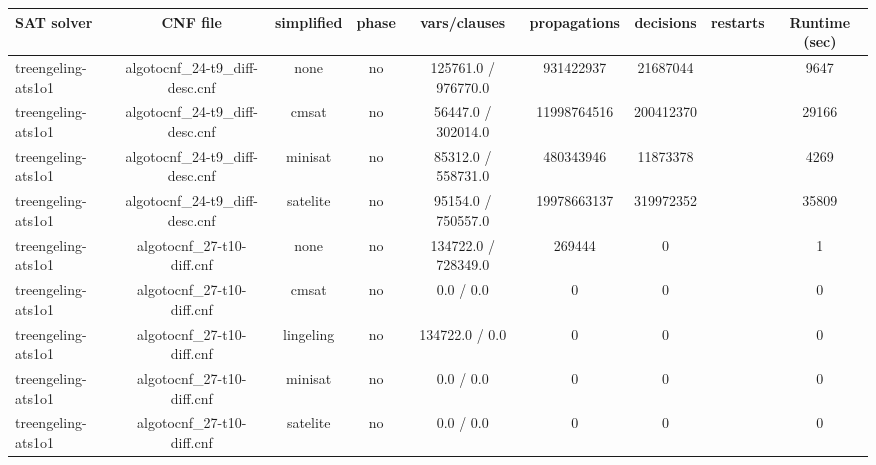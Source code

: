 \begin{appendices}
\begin{table}[p]
  \begin{center}
    \begin{tabular}{l|cccccccc}
        \textbf{SAT solver} & \textbf{CNF file} & \textbf{simplified} & \textbf{phase} & \textbf{vars/clauses} & \textbf{propagations} & \textbf{decisions} & \textbf{restarts} & \textbf{Runtime (sec)} \\
      \hline
  treengeling-ats1o1             & algotocnf\_24-t9\_diff-desc.cnf & none       & no    & 125761.0 / 976770.0 & 931422937 & 21687044  &            & 9647 \\ %
  treengeling-ats1o1             & algotocnf\_24-t9\_diff-desc.cnf & cmsat      & no    & 56447.0 / 302014.0 & 11998764516 & 200412370 &            & 29166 \\ %
  treengeling-ats1o1             & algotocnf\_24-t9\_diff-desc.cnf & minisat    & no    & 85312.0 / 558731.0 & 480343946 & 11873378  &            & 4269 \\ %
  treengeling-ats1o1             & algotocnf\_24-t9\_diff-desc.cnf & satelite   & no    & 95154.0 / 750557.0 & 19978663137 & 319972352 &            & 35809 \\ %
  treengeling-ats1o1             & algotocnf\_27-t10-diff.cnf     & none       & no    & 134722.0 / 728349.0 & 269444    & 0         &            & 1 \\ %
  treengeling-ats1o1             & algotocnf\_27-t10-diff.cnf     & cmsat      & no    & 0.0 / 0.0  & 0         & 0         &            & 0 \\ %
  treengeling-ats1o1             & algotocnf\_27-t10-diff.cnf     & lingeling  & no    & 134722.0 / 0.0 & 0         & 0         &            & 0 \\ %
  treengeling-ats1o1             & algotocnf\_27-t10-diff.cnf     & minisat    & no    & 0.0 / 0.0  & 0         & 0         &            & 0 \\ %
  treengeling-ats1o1             & algotocnf\_27-t10-diff.cnf     & satelite   & no    & 0.0 / 0.0  & 0         & 0         &            & 0 \\ %

\end{tabular}
\end{center}
\end{table}
\end{appendices}

